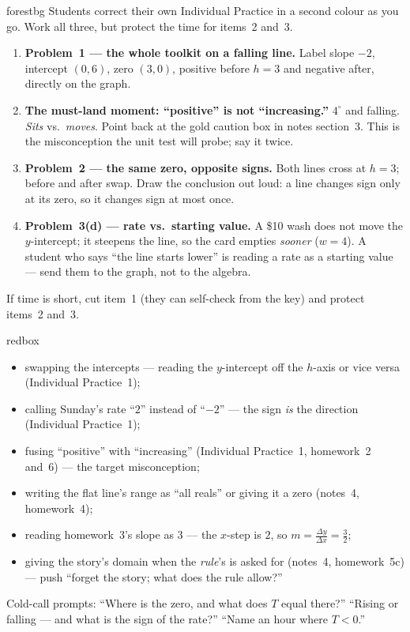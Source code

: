 \documentclass[10pt]{article}
\begin{document}
\boxguard
\begin{skillbox}{forestbg}
Students correct their own Individual Practice in a second colour as you go. Work all three, but
protect the time for items~2 and~3.
\begin{enumerate}[leftmargin=1.3em, nosep, itemsep=2pt]
  \item \textbf{Problem~1 --- the whole toolkit on a falling line.} Label slope $-2$, intercept
        $(0,6)$, zero $(3,0)$, positive before $h=3$ and negative after, directly on the graph.
  \item \textbf{The must-land moment: ``positive'' is not ``increasing.''} $4^\circ$ and
        falling. \emph{Sits} vs.\ \emph{moves}. Point back at the gold caution box in notes
        section~3. This is the misconception the unit test will probe; say it twice.
  \item \textbf{Problem~2 --- the same zero, opposite signs.} Both lines cross at $h=3$; before
        and after swap. Draw the conclusion out loud: a line changes sign only at its zero, so it
        changes sign at most once.
  \item \textbf{Problem~3(d) --- rate vs.\ starting value.} A \$10 wash does not move the
        $y$-intercept; it steepens the line, so the card empties \emph{sooner} ($w=4$). A student
        who says ``the line starts lower'' is reading a rate as a starting value --- send them to
        the graph, not to the algebra.
\end{enumerate}
If time is short, cut item~1 (they can self-check from the key) and protect items~2 and~3.
\end{skillbox}

\boxguard
\begin{skillbox}{redbox}
\begin{itemize}[leftmargin=1.2em, nosep]
  \item swapping the intercepts --- reading the $y$-intercept off the $h$-axis or vice versa (Individual Practice~1);
  \item calling Sunday's rate ``$2$'' instead of ``$-2$'' --- the sign \emph{is} the direction (Individual Practice~1);
  \item fusing ``positive'' with ``increasing'' (Individual Practice~1, homework~2 and~6) --- the target misconception;
  \item writing the flat line's range as ``all reals'' or giving it a zero (notes~4, homework~4);
  \item reading homework~3's slope as $3$ --- the $x$-step is $2$, so $m=\tfrac{\Delta y}{\Delta x}=\tfrac32$;
  \item giving the story's domain when the \emph{rule}'s is asked for (notes~4, homework~5c) --- push ``forget the story; what does the rule allow?''
\end{itemize}
Cold-call prompts: ``Where is the zero, and what does $T$ equal there?'' ``Rising or falling --- and
what is the sign of the rate?'' ``Name an hour where $T<0$.''
\end{skillbox}
\end{document}
